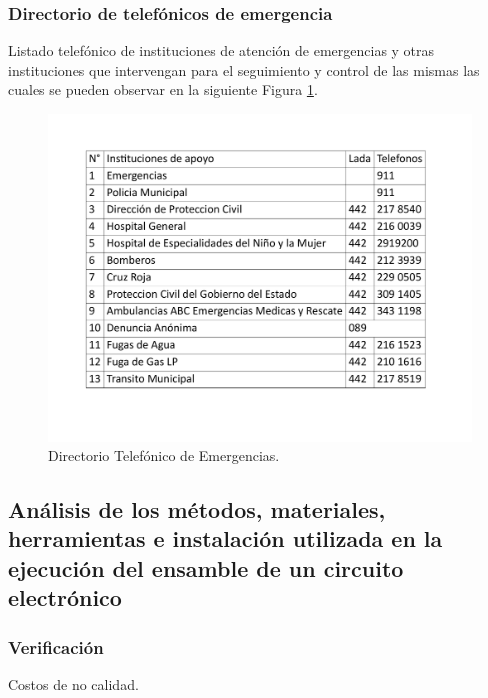    \subsubsection{Directorio de telefónicos de emergencia}
    
    Listado telefónico de instituciones de atención de emergencias y otras instituciones que intervengan para el seguimiento y control de las mismas las cuales se pueden observar en la siguiente Figura \ref{fig:directorioEmergencias}.
    
    \begin{figure}[H]
        \centering
        \includegraphics[scale=0.3]{21/img/directorioEmergecias.pdf}
        \caption{Directorio Telefónico de Emergencias.}
        \label{fig:directorioEmergencias}
    \end{figure}
    
    \subsection{Análisis de los métodos, materiales, herramientas e instalación utilizada en la ejecución del ensamble de un circuito electrónico}
    
    \subsubsection{Verificación}
    
    Costos de no calidad.
